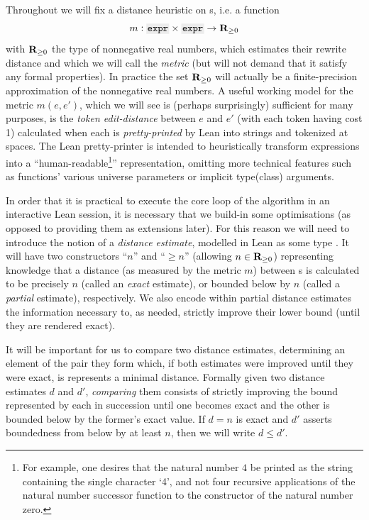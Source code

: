 \documentclass[12pt]{article}
\begin{document}
Throughout we will fix a distance heuristic on \expr{}s, i.e. a function
\begin{equation*}
  m : \xx{expr} \times \xx{expr} \to \RR_{\geq 0}
\end{equation*}
with $\mathbf{R}_{\geq 0}$ the type of nonnegative real numbers, which estimates their rewrite distance and which we will call the \textit{metric} (but will not demand that it satisfy any formal properties). In practice the set $\mathbf{R}_{\geq 0}$ will actually be a finite-precision approximation of the nonnegative real numbers. A useful working model for the metric $m(e, e')$, which we will see is (perhaps surprisingly) sufficient for many purposes, is the \textit{token edit-distance} between $e$ and $e'$ (with each token having cost 1) calculated when each is \textit{pretty-printed} by Lean into strings and tokenized at spaces. The Lean pretty-printer is intended to heuristically transform expressions into a ``human-readable\footnote{For example, one desires that the natural number $4$ be printed as the string containing the single character `4', and not four recursive applications of the natural number successor function to the constructor of the natural number zero.}'' representation, omitting more technical features such as functions' various universe parameters or implicit type(class) arguments.

In order that it is practical to execute the core loop of the algorithm in an interactive Lean session, it is necessary that we build-in some optimisations (as opposed to providing them as extensions later). For this reason we will need to introduce the notion of a \textit{distance estimate}, modelled in Lean as some type . It will have two constructors ``$n$'' and ``$\geq n$'' (allowing $n \in \mathbf{R}_{\geq 0}$) representing knowledge that a distance (as measured by the metric $m$) between \expr{}s is calculated to be precisely $n$ (called an \textit{exact} estimate), or bounded below by $n$ (called a \textit{partial} estimate), respectively. We also encode within partial distance estimates the information necessary to, as needed, strictly improve their lower bound (until they are rendered exact).

It will be important for us to compare two distance estimates, determining an element of the pair they form which, if both estimates were improved until they were exact, is represents a minimal distance. Formally given two distance estimates $d$ and $d'$, \textit{comparing} them consists of strictly improving the bound represented by each in succession until one becomes exact and the other is bounded below by the former's exact value. If $d = n$ is exact and $d'$ asserts boundedness from below by at least $n$, then we will write $d \leq d'$.
\end{document}
